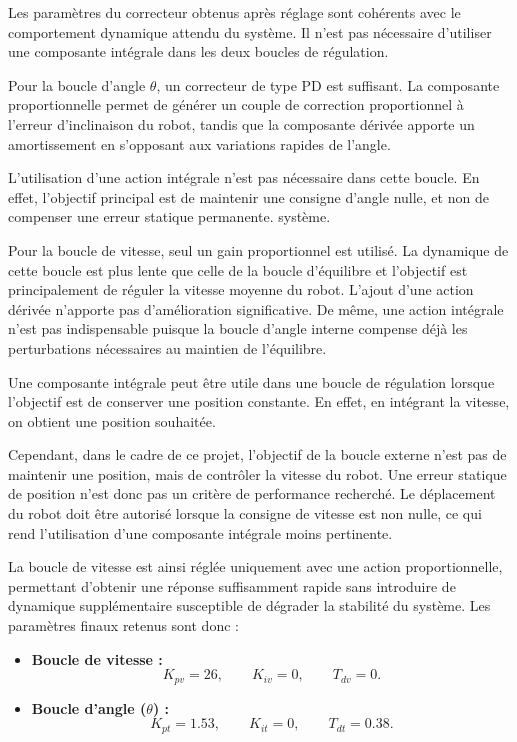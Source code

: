 Les paramètres du correcteur obtenus après réglage sont cohérents avec le comportement dynamique attendu du système. Il n'est pas nécessaire d'utiliser une composante intégrale dans les deux boucles de régulation.

Pour la boucle d'angle $\theta$, un correcteur de type PD est suffisant. La composante proportionnelle permet de générer un couple de correction proportionnel à l'erreur d'inclinaison du robot, tandis que la composante dérivée apporte un amortissement en s'opposant aux variations rapides de l'angle.

L'utilisation d'une action intégrale n'est pas nécessaire dans cette boucle. En effet, l'objectif principal est de maintenir une consigne d'angle nulle, et non de compenser une erreur statique permanente. système.

Pour la boucle de vitesse, seul un gain proportionnel est utilisé. La dynamique de cette boucle est plus lente que celle de la boucle d'équilibre et l'objectif est principalement de réguler la vitesse moyenne du robot. L'ajout d'une action dérivée n'apporte pas d'amélioration significative. De même, une action intégrale n'est pas indispensable puisque la boucle d'angle interne compense déjà les perturbations nécessaires au maintien de l'équilibre.

Une composante intégrale peut être utile dans une boucle de régulation lorsque l'objectif est de conserver une position constante. En effet, en intégrant la vitesse, on obtient une position souhaitée.

Cependant, dans le cadre de ce projet, l'objectif de la boucle externe n'est pas de maintenir une position, mais de contrôler la vitesse du robot. Une erreur statique de position n'est donc pas un critère de performance recherché. Le déplacement du robot doit être autorisé lorsque la consigne de vitesse est non nulle, ce qui rend l'utilisation d'une composante intégrale moins pertinente.

La boucle de vitesse est ainsi réglée uniquement avec une action proportionnelle, permettant d'obtenir une réponse suffisamment rapide sans introduire de dynamique supplémentaire susceptible de dégrader la stabilité du système.
Les paramètres finaux retenus sont donc :

\begin{itemize}
    \item \textbf{Boucle de vitesse :}
    \[
    K_{pv}=26,\qquad
    K_{iv}=0,\qquad
    T_{dv}=0.
    \]

    \item \textbf{Boucle d'angle ($\theta$) :}
    \[
    K_{pt}=1.53,\qquad
    K_{it}=0,\qquad
    T_{dt}=0.38.
    \]
\end{itemize}
